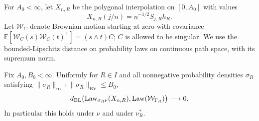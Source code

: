 For $A_0<\infty$, let $X_{n,R}$ be the polygonal interpolation on
$[0,A_0]$ with values
\[
 X_{n,R}(j/n)=n^{-1/2}S_{j,R}h_R.
\]
Let $\mathcal W_C$ denote Brownian motion starting at zero with covariance
$\mathbb E[\mathcal W_C(s)\mathcal W_C(t)^{\mathsf T}]=(s\wedge t)C$;
$C$ is allowed to be singular. We use the bounded-Lipschitz distance on
probability laws on continuous path space, with its supremum norm.

\begin{theorem}
\label{thm:collision-functional}
Fix $A_0,B_0<\infty$. Uniformly for $R\in I$ and all nonnegative
probability densities $\sigma_R$ satisfying
$\|\sigma_R\|_\infty+\|\sigma_R\|_{\mathrm{BV}}\le B_0$,
\begin{equation}\label{eq:collision-functional}
 d_{\rm BL}\bigl(\operatorname{Law}_{\sigma_R\nu}(X_{n,R}),
                     \operatorname{Law}(\mathcal W_{\Gamma_R})\bigr)
       \longrightarrow0.
\end{equation}
In particular this holds under $\nu$ and under $\nu_R^*$.
\end{theorem}
